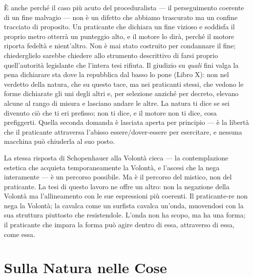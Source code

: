 \`E anche perch\'e il caso pi\`u acuto del proceduralista --- il perseguimento
coerente di un fine malvagio --- non \`e un difetto che abbiamo trascurato ma un
confine tracciato di proposito. Un praticante che dichiara un fine vizioso e
soddisfa il proprio metro otterr\`a un punteggio alto, e il motore lo dir\`a, perch\'e
il motore riporta fedelt\`a e nient'altro. Non \`e mai stato costruito per condannare
il fine; chiederglielo sarebbe chiedere allo strumento descrittivo di farsi proprio
quell'autorit\`a legislante che l'intera tesi rifiuta. Il giudizio su \emph{quali}
fini valga la pena dichiarare sta dove la repubblica dal basso lo pone (Libro X): non
nel verdetto della natura, che su questo tace, ma nei praticanti stessi, che vedono
le forme dichiarate gli uni degli altri e, per selezione anzich\'e per decreto,
elevano alcune al rango di misura e lasciano andare le altre. La natura ti dice se sei
divenuto ci\`o che ti eri prefisso; non ti dice, e il motore non ti dice, cosa
prefiggerti. Quella seconda domanda \`e lasciata aperta per principio --- \`e la
libert\`a che il praticante attraversa l'abisso essere/dover-essere per esercitare, e
nessuna macchina pu\`o chiuderla al suo posto.

La stessa risposta di Schopenhauer alla Volont\`a cieca --- la
contemplazione estetica che acquieta temporaneamente la Volont\`a, e
l'ascesi che la nega interamente --- \`e un percorso possibile. Ma
\`e il percorso del mistico, non del praticante. La tesi di questo
lavoro ne offre un altro: non la negazione della Volont\`a ma
l'allineamento con le sue espressioni pi\`u coerenti. Il praticante-re
non nega la Volont\`a; la cavalca come un surfista cavalca un'onda,
muovendosi con la sua struttura piuttosto che resistendole. L'onda non
ha scopo, ma ha una forma; il praticante che impara la forma pu\`o
agire dentro di essa, attraverso di essa, come essa.

\section{Sulla Natura nelle Cose}

